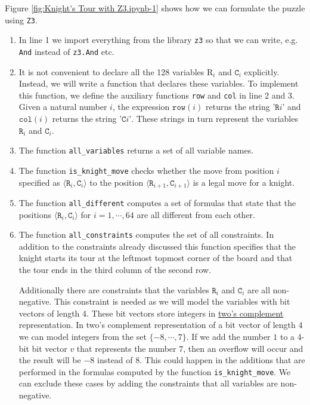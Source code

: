 Figure \ref{fig:Knight's Tour with Z3.ipynb-1} shows how we can formulate the puzzle using \texttt{Z3}.
\begin{enumerate}
\item In line 1 we import everything from the library \texttt{z3} so that we can write, e.g.~
      \texttt{And} instead of \texttt{z3.And} etc.
\item It is not convenient to declare all the 128 variables $\mathrm{R}_i$ and $\mathtt{C}_i$
      explicitly.  Instead, we will write a function that declares these variables.  To implement
      this function, we define the auxiliary functions \texttt{row} and \texttt{col} in line 2 and 3.
      Given a natural number $i$, the expression $\mathtt{row}(i)$ returns the string $\texttt{'R}i\texttt{'}$
      and  $\mathtt{col}(i)$ returns the string  $\texttt{'C}i\texttt{'}$.  These strings in turn represent the
      variables $\mathtt{R}_i$ and $\mathtt{C}_i$.
\item The function \texttt{all\_variables} returns a set of all variable names.
\item The function \texttt{is\_knight\_move} checks whether the move from position $i$ specified as
      $\langle \mathtt{R}_i, \mathtt{C}_i \rangle$ to the position $\langle \mathtt{R}_{i+1}, \mathtt{C}_{i+1} \rangle$
      is a legal move for a knight.
\item The function \texttt{all\_different} computes a set of formulas that state that the positions
      $\langle \mathtt{R}_i, \mathtt{C}_i \rangle$ for $i=1,\cdots, 64$ are all different from each other.
\item The function \texttt{all\_constraints} computes the set of all constraints.
      In addition to the constraints already discussed this function specifies that the knight starts
      its tour at the leftmost topmost corner of the board and that the tour ends in the third column of the
      second row.

      Additionally there are constraints that the variables $\mathtt{R}_i$ and $\mathtt{C}_i$ are all
      non-negative.  This constraint is needed as we will model the variables with bit vectors of length 4.
      These bit vectors store integers in
      \href{https://en.wikipedia.org/wiki/Two%27s_complement}{two's complement} representation.
      In two's complement representation of a bit vector of length 4 we can model integers from the set
      $\{-8, \cdots, 7\}$.  If we add the number $1$ to a 4-bit bit vector $v$ that represents the number $7$,
      then an overflow will occur and the result will be $-8$ instead of $8$. This could happen in the
      additions that are performed in the formulas computed by the function \texttt{is\_knight\_move}.
      We can exclude these cases by adding the constraints that all variables are non-negative.
\end{enumerate}

